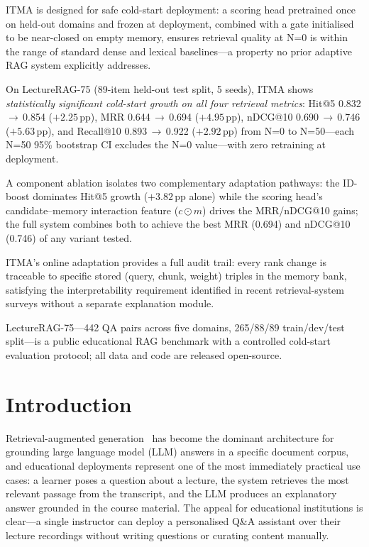 \documentclass[preprint,12pt]{elsarticle}
\begin{document}
\begin{highlights}
\item ITMA is designed for safe cold-start deployment: a scoring head pretrained
      once on held-out domains and frozen at deployment, combined with a gate
      initialised to be near-closed on empty memory, ensures retrieval quality
      at N=0 is within the range of standard dense and lexical baselines---a
      property no prior adaptive RAG system explicitly addresses.
\item On LectureRAG-75 (89-item held-out test split, 5 seeds), ITMA shows
      \emph{statistically significant cold-start growth on all four retrieval
      metrics}: Hit@5 0.832\,$\rightarrow$\,0.854 ($+2.25$\,pp), MRR
      0.644\,$\rightarrow$\,0.694 ($+4.95$\,pp), nDCG@10
      0.690\,$\rightarrow$\,0.746 ($+5.63$\,pp), and Recall@10
      0.893\,$\rightarrow$\,0.922 ($+2.92$\,pp) from N=0 to N=50---each N=50
      95\% bootstrap CI excludes the N=0 value---with zero retraining at
      deployment.
\item A component ablation isolates two complementary adaptation pathways:
      the ID-boost dominates Hit@5 growth ($+3.82$\,pp alone) while the
      scoring head's candidate--memory interaction feature ($c{\odot}m$)
      drives the MRR/nDCG@10 gains; the full system combines both to achieve
      the best MRR (0.694) and nDCG@10 (0.746) of any variant tested.
\item ITMA's online adaptation provides a full audit trail: every rank change
      is traceable to specific stored (query, chunk, weight) triples in the
      memory bank, satisfying the interpretability requirement identified in
      recent retrieval-system surveys without a separate explanation module.
\item LectureRAG-75---442 QA pairs across five domains, 265/88/89
      train/dev/test split---is a public educational RAG benchmark with a
      controlled cold-start evaluation protocol; all data and code are
      released open-source.
\end{highlights}

\section{Introduction}
\label{sec:intro}

Retrieval-augmented generation~\citep{lewis2020rag} has become the dominant
architecture for grounding large language model (LLM) answers in a specific
document corpus, and educational deployments represent one of the most
immediately practical use cases: a learner poses a question about a lecture,
the system retrieves the most relevant passage from the transcript, and the LLM
produces an explanatory answer grounded in the course material.  The appeal for
educational institutions is clear---a single instructor can deploy a
personalised Q\&A assistant over their lecture recordings without writing
questions or curating content manually.
\end{document}
